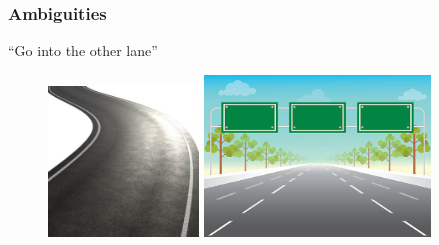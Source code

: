 \documentclass{beamer}
\begin{document}
\begin{frame}
\frametitle{Ambiguities}

\begin{center}
\begin{minipage}{4cm}
\begin{alertblock}{}
``Go into the other lane''
\end{alertblock}
\end{minipage}
\end{center}
\pause
\begin{figure}
\hspace*{-3mm}%
\centering
   \includegraphics[width=4cm]{pics/singleLane.jpg}
   \pause
   \includegraphics[width=6cm]{pics/multipleLane.jpg}
\end{figure}
  
\end{frame}
\end{document}
